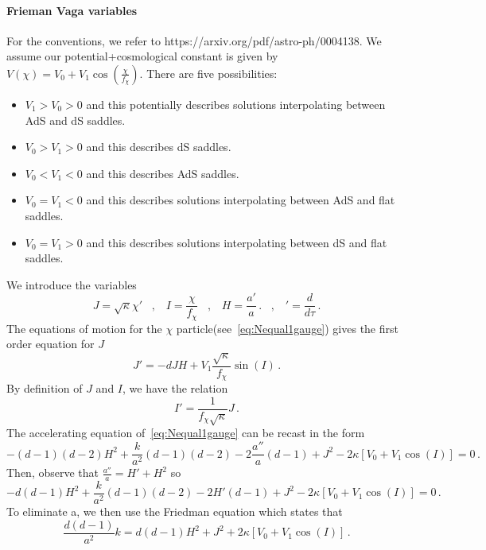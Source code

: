 \documentclass[a4paper]{article}
\def\sp{\;\;\;,\;\;\;}
\begin{document}
\paragraph{Frieman Vaga variables} For the conventions, we refer to https://arxiv.org/pdf/astro-ph/0004138. We assume our potential+cosmological constant is given by $V(\chi) = V_0 + V_1 \cos\left(\frac{\chi} {f_\chi}\right)$. There are five possibilities:
\begin{itemize}
    \item $V_1>V_0>0$ and this potentially describes solutions interpolating between AdS and dS saddles.
    \item $V_0>V_1>0$ and this describes dS saddles.
    \item $V_0<V_1<0$ and this describes AdS saddles.
    \item $V_0=V_1<0$ and this describes solutions interpolating between AdS and flat saddles.
    \item $V_0=V_1>0$ and this describes solutions interpolating between dS and flat saddles.
\end{itemize}
We introduce the variables 
\begin{equation}
        J=\sqrt{\kappa}\chi' \sp I=\frac{\chi}{f_{\chi}} \sp H =\frac{a'}{a}\,. \sp '=\frac{d}{d\tau}\,.
\end{equation}
The equations of motion for the $\chi$ particle(see~\eqref{eq:Nequal1gauge}) gives the first order equation for $J$
\begin{equation}
    J'=-dJH+V_1\frac{\sqrt{\kappa}}{f_\chi }\sin(I)\,.
\end{equation}
By definition of $J$ and $I$, we have the relation
\begin{equation}
    I' =\frac{1}{f_\chi\sqrt{\kappa}}J\,.
\end{equation}
The accelerating equation of~\eqref{eq:Nequal1gauge} can be recast in the form
\begin{equation}
    -(d-1)(d-2)H^2+\frac{k}{a^2}(d-1)(d-2)-2\frac{a''}{a}(d-1)+J^2-2\kappa\left[V_0+V_1\cos(I)\right]=0\,.
\end{equation}
Then, observe that $\frac{a''}{a}=H'+H^2$ so
\begin{equation}
    -d(d-1)H^2+\frac{k}{a^2}(d-1)(d-2)-2H'(d-1)+J^2-2\kappa\left[V_0+V_1\cos(I)\right]=0\,.
\end{equation}
To eliminate a, we then use the Friedman equation which states that 
\begin{equation}
    \frac{d(d-1)}{a^2}k=d(d-1)H^2+J^2+2\kappa\left[V_0+V_1\cos(I)\right]\,.
\end{equation}
\end{document}
